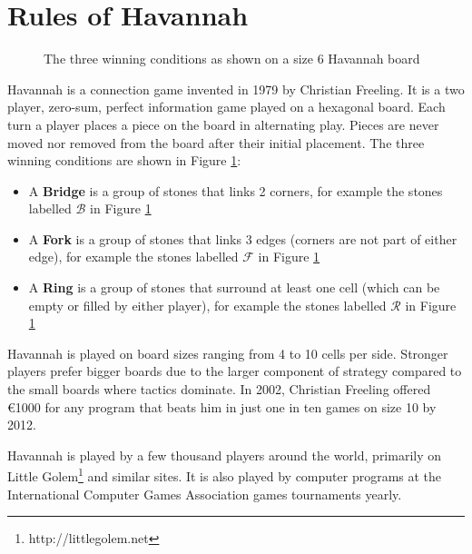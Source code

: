 
\section{Rules of Havannah}


\begin{figure}
\centering
\begin{HavannahBoard}[board size=6,coordinate style=classical]
\end{HavannahBoard}
\caption{The three winning conditions as shown on a size 6 Havannah board}
\label{fig:rules}
\end{figure}

Havannah is a connection game invented in 1979 by Christian Freeling. It is a two player, zero-sum, perfect information game played on a hexagonal board. Each turn a player places a piece on the board in alternating play. Pieces are never moved nor removed from the board after their initial placement. The three winning conditions are shown in Figure \ref{fig:rules}:
\begin{itemize}
	\setlength{\itemsep}{0pt}
	\setlength{\parskip}{0pt}
	\setlength{\parsep}{0pt}
	\item A \textbf{Bridge} is a group of stones that links 2 corners, for example the stones labelled $\mathcal B$ in Figure \ref{fig:rules}
	\item A \textbf{Fork} is a group of stones that links 3 edges (corners are not part of either edge), for example the stones labelled $\mathcal F$ in Figure \ref{fig:rules}
	\item A \textbf{Ring} is a group of stones that surround at least one cell (which can be empty or filled by either player), for example the stones labelled $\mathcal R$ in Figure \ref{fig:rules}
\end{itemize}

Havannah is played on board sizes ranging from 4 to 10 cells per side. Stronger players prefer bigger boards due to the larger component of strategy compared to the small boards where tactics dominate. In 2002, Christian Freeling offered \euro 1000 for any program that beats him in just one in ten games on size 10 by 2012.

Havannah is played by a few thousand players around the world, primarily on Little Golem\footnote{http://littlegolem.net} and similar sites. It is also played by computer programs at the International Computer Games Association games tournaments yearly.



